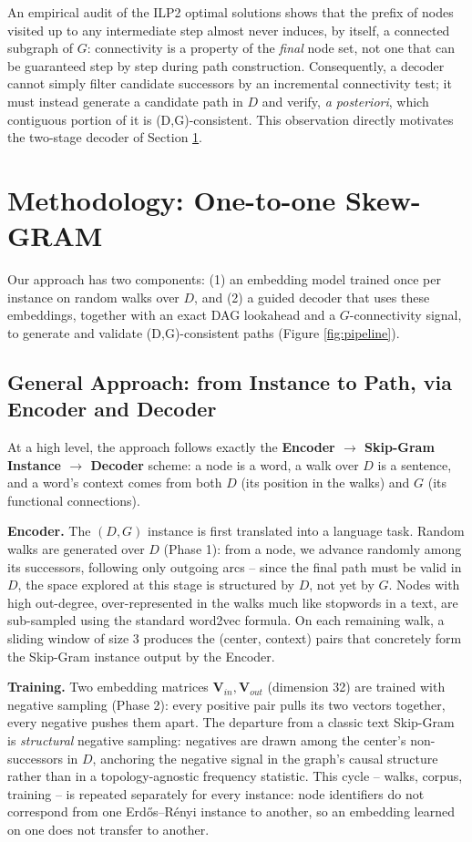 \documentclass{llncs}
\begin{document}
An empirical audit of the ILP2 optimal solutions shows that the prefix of nodes visited up to any intermediate step almost never induces, by itself, a connected subgraph of $G$: connectivity is a property of the \emph{final} node set, not one that can be guaranteed step by step during path construction. Consequently, a decoder cannot simply filter candidate successors by an incremental connectivity test; it must instead generate a candidate path in $D$ and verify, \emph{a posteriori}, which contiguous portion of it is (D,G)-consistent. This observation directly motivates the two-stage decoder of Section \ref{sec:method}.

\section{Methodology: One-to-one Skew-GRAM}
\label{sec:method}

Our approach has two components: (1) an embedding model trained once per instance on random walks over $D$, and (2) a guided decoder that uses these embeddings, together with an exact DAG lookahead and a $G$-connectivity signal, to generate and validate (D,G)-consistent paths (Figure \ref{fig:pipeline}).

\subsection{General Approach: from Instance to Path, via Encoder and Decoder}
\label{sec:demarche}

At a high level, the approach follows exactly the \textbf{Encoder $\to$ Skip-Gram Instance $\to$ Decoder} scheme: a node is a word, a walk over $D$ is a sentence, and a word's context comes from both $D$ (its position in the walks) and $G$ (its functional connections).

\textbf{Encoder.} The $(D,G)$ instance is first translated into a language task. Random walks are generated over $D$ (Phase 1): from a node, we advance randomly among its successors, following only outgoing arcs -- since the final path must be valid in $D$, the space explored at this stage is structured by $D$, not yet by $G$. Nodes with high out-degree, over-represented in the walks much like stopwords in a text, are sub-sampled using the standard word2vec formula. On each remaining walk, a sliding window of size 3 produces the (center, context) pairs that concretely form the Skip-Gram instance output by the Encoder.

\textbf{Training.} Two embedding matrices $\mathbf{V}_{in}, \mathbf{V}_{out}$ (dimension 32) are trained with negative sampling (Phase 2): every positive pair pulls its two vectors together, every negative pushes them apart. The departure from a classic text Skip-Gram is \emph{structural} negative sampling: negatives are drawn among the center's non-successors in $D$, anchoring the negative signal in the graph's causal structure rather than in a topology-agnostic frequency statistic. This cycle -- walks, corpus, training -- is repeated separately for every instance: node identifiers do not correspond from one Erdős--Rényi instance to another, so an embedding learned on one does not transfer to another.
\end{document}

